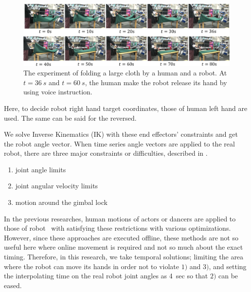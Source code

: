 \begin{figure}[htbp]
 \begin{center}
  \includegraphics[width=2.00\columnwidth]{figs/cloth_folding}
  \caption{The experiment of folding a large cloth by a human and a robot. At \(t=\SI{36}{s}\) and \(t=\SI{60}{s}\), the human make the robot release its hand by using voice instruction.}
  \label{figure:folding_cloth}
 \end{center}
\end{figure}

Here, to decide robot right hand target coordinates, those of human left hand are used. The same can be said for the reversed.
%

We solve Inverse Kinematics (IK) with these end effectors' constraints and get the robot angle vector. When time series angle vectors are applied to the real robot, there are three major constraints or difficulties, described in \cite{adapt_human_motion}.
\begin{enumerate}
  \item joint angle limits
  \item joint angular velocity limits
  \item motion around the gimbal lock
\end{enumerate}
In the previous researches, human motions of actors or dancers are applied to those of robot~\cite{adapt_human_motion}\cite{bandaisan} with satisfying these restrictions with various optimizations. However, since these approaches are executed offline, these methods are not so useful here where online movement is required and not so much about the exact timing. Therefore, in this research, we take temporal solutions; limiting the area where the robot can move its hands in order not to violate \(1)\) and \(3)\), and setting the interpolating time on the real robot joint angles as \SI{4}{sec} so that \(2)\) can be eased.\par

